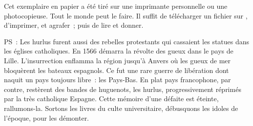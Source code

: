 \documentclass[french,twoside]{book} %
\begin{document}
  Cet exemplaire en papier a été tiré sur une imprimante personnelle
   ou une photocopieuse. Tout le monde peut le faire.
  Il suffit de
  télécharger un fichier sur \href{https://hurlus.fr}{},
  d’imprimer, et agrafer ; puis de lire et donner.\par

  \bigskip

  \noindent PS : Les hurlus furent aussi des rebelles protestants qui cassaient les statues dans les églises catholiques. En 1566 démarra la révolte des gueux dans le pays de Lille. L’insurrection enflamma la région jusqu’à Anvers où les gueux de mer bloquèrent les bateaux espagnols.
  Ce fut une rare guerre de libération dont naquit un pays toujours libre : les Pays-Bas.
  En plat pays francophone, par contre, restèrent des bandes de huguenots, les hurlus, progressivement réprimés par la très catholique Espagne.
  Cette mémoire d’une défaite est éteinte, rallumons-la. Sortons les livres du culte universitaire, débusquons les idoles de l’époque, pour les démonter.
\fi
\end{document}
